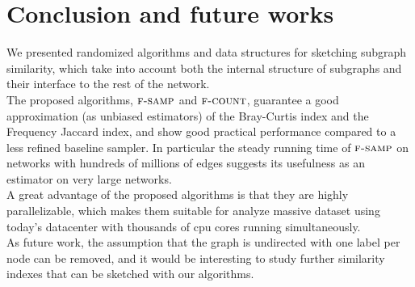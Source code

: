 \chapter{Conclusion and future works}
    

We presented randomized algorithms and data structures for sketching subgraph similarity, 
which take into account both the internal structure of subgraphs and their interface to the rest of the network. \\

The proposed algorithms, $\textsc{f-samp}$ and $\textsc{f-count}$, guarantee a good approximation
(as unbiased estimators) of the Bray-Curtis index and the Frequency
Jaccard index, and show good practical performance compared to a
less refined baseline sampler. In particular the steady running time
of $\textsc{f-samp}$ on networks with hundreds of millions of edges suggests
its usefulness as an estimator on very large networks.\\

A great advantage of the proposed algorithms is that they are highly parallelizable,
which makes them suitable for analyze massive dataset using today's datacenter with 
thousands of cpu cores running simultaneously.\\

As future work, the assumption that the graph is undirected with one label per
node can be removed, and it would be interesting to study further
similarity indexes that can be sketched with our algorithms.